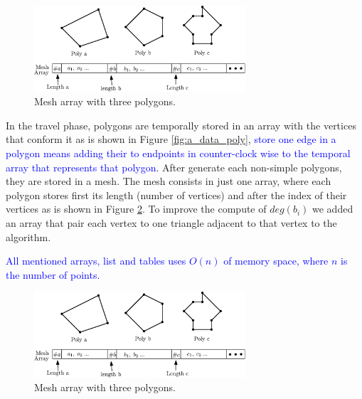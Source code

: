 \documentclass[pdflatex,sn-mathphys]{sn-jnl}%
\theoremstyle{thmstyleone}%
\theoremstyle{thmstyletwo}%
\theoremstyle{thmstylethree}%
\begin{document}

\begin{figure}[]
    \centering
\includegraphics[width=0.7\textwidth]{meshdatastruct.eps}
    \caption{Mesh array with three polygons.} 
    \label{fig:meshdatastruct}
\end{figure}


In the travel phase, polygons are temporally stored in an array with the vertices that conform it as is shown in Figure \ref{fig:a_data_poly}, \textcolor{blue}{ store one edge in a polygon means adding their to endpoints in counter-clock wise to the temporal array that represents that polygon}. After generate each non-simple polygons, they are stored in a mesh. The mesh consists in just one array, where each polygon stores first its length (number of vertices) and after the index of their vertices as is shown in Figure \ref{fig:meshdatastruct}. To improve the compute of $deg(b_i)$ we added an array that pair each vertex to one triangle adjacent to that vertex to the algorithm.



\textcolor{blue}{All mentioned arrays, list and tables uses $O(n)$ of memory space, where $n$ is the number of points.}


\begin{figure}[]
    \centering
\includegraphics[width=0.7\textwidth]{meshdatastruct.eps}
    \caption{Mesh array with three polygons.} 
    \label{fig:meshdatastruct}
\end{figure}
\end{document}
